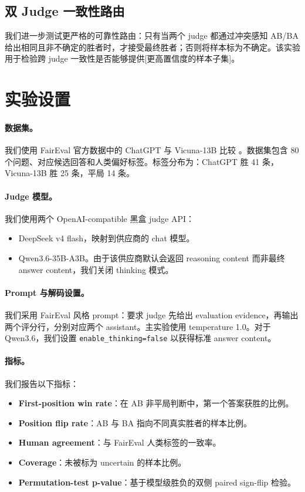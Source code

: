 \documentclass[11pt]{ctexart}
\begin{document}
\subsection{双 Judge 一致性路由}

我们进一步测试更严格的可靠性路由：只有当两个 judge 都通过冲突感知 AB/BA 给出相同且非不确定的胜者时，才接受最终胜者；否则将样本标为不确定。该实验用于检验跨 judge 一致性是否能够提供[更高置信度的样本子集]。

\section{实验设置}

\paragraph{数据集。}
我们使用 FairEval 官方数据中的 ChatGPT 与 Vicuna-13B 比较 \cite{wang2024faireval,chiang2023vicuna}。数据集包含 80 个问题、对应候选回答和人类偏好标签。标签分布为：ChatGPT 胜 41 条，Vicuna-13B 胜 25 条，平局 14 条。

\paragraph{Judge 模型。}
我们使用两个 OpenAI-compatible 黑盒 judge API：
\begin{itemize}
    \item DeepSeek v4 flash，映射到供应商的 chat 模型。
    \item Qwen3.6-35B-A3B。由于该供应商默认会返回 reasoning content 而非最终 answer content，我们关闭 thinking 模式。
\end{itemize}

\paragraph{Prompt 与解码设置。}
我们采用 FairEval 风格 prompt：要求 judge 先给出 evaluation evidence，再输出两个评分行，分别对应两个 assistant。主实验使用 temperature 1.0。对于 Qwen3.6，我们设置 \texttt{enable\_thinking=false} 以获得标准 answer content。

\paragraph{指标。}
我们报告以下指标：
\begin{itemize}
    \item \textbf{First-position win rate}：在 AB 非平局判断中，第一个答案获胜的比例。
    \item \textbf{Position flip rate}：AB 与 BA 指向不同真实胜者的样本比例。
    \item \textbf{Human agreement}：与 FairEval 人类标签的一致率。
    \item \textbf{Coverage}：未被标为 uncertain 的样本比例。
    \item \textbf{Permutation-test p-value}：基于模型级胜负的双侧 paired sign-flip 检验。
\end{itemize}
\end{document}
